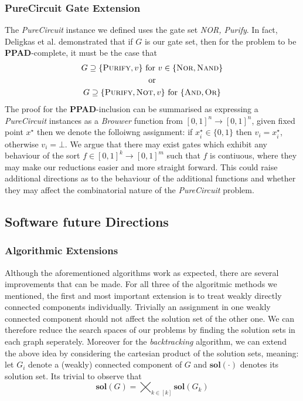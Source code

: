 \subsubsection{PureCircuit Gate Extension} %
The \textit{PureCircuit} instance we defined uses the gate set
\textit{NOR, Purify}. In fact, Deligkas et al. \cite{deligkas_PureCircuitTightInapproximability_2024}
demonstrated that if $G$ is our gate set, then for the problem to be \textbf{PPAD}-complete,
it must be the case that
\begin{gather*}
G \supseteq \{\textsc{Purify}, v\} \text{ for } v \in \{\textsc{Nor}, \textsc{Nand}\} \\
\text{ or }\\
G \supseteq \{\textsc{Purify}, \textsc{Not}, v\}  \text{ for } \{\textsc{And}, \textsc{Or}\} \\
\end{gather*}
The proof for the \textbf{PPAD}-inclusion can be summarised as expressing a \textit{PureCircuit} instances
as a \textit{Brouwer} function from $[0,1]^n \to [0,1]^n$, given fixed point $x^\star$ then
we denote the folloiwng assignment: if $x^\star_i \in \{0,1\}$ then $v_i = x^{\star}_i$, otherwise
$v_i = \bot$. We argue that there may exist gates which exhibit any behaviour of the sort $f \in [0,1]^k \to [0,1]^m$
such that $f$ is contiuous, where they may make our reductions easier and more straight forward.
This could raise additional directions as to the behaviour of the additional functions
and whether they may affect the combinatorial nature of the \textit{PureCircuit} problem.

\subsection{Software future Directions}

\subsubsection{Algorithmic Extensions}
Although the aforementioned algorithms work as expected, there are several improvements that can be made.
For all three of the algoritmic methods we mentioned, the first and most important extension
is to treat weakly directly connected components individually. Trivially an assignment in one
weakly connected component should not affect the solution set of the other one.
We can therefore reduce the search spaces of our problems by finding
the solution sets in each graph seperately. Moreover for the
\textit{backtracking} algorithm, we can extend the above idea by considering
the cartesian product of the solution sets, meaning:
let $G_i$ denote a (weakly) connected component of $G$ and $\textbf{sol}(\cdot)$
denotes its solution set. Its trivial to observe that
$$
    \textbf{sol}(G) = \bigtimes_{k \in [k]}  \textbf{sol}(G_k)
$$

